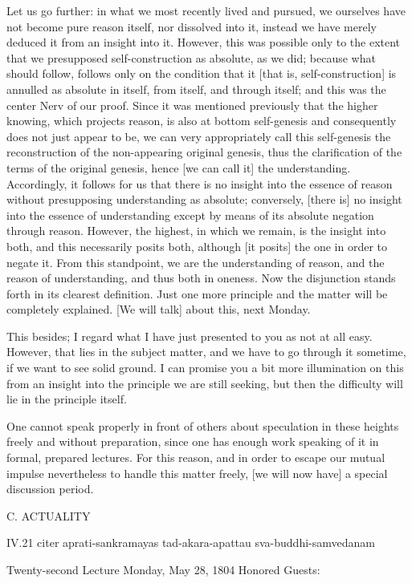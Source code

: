 Let us go further:
in what we most recently lived and pursued,
we ourselves have not become pure reason itself,
nor dissolved into it, instead we have merely
deduced it from an insight into it.
However, this was possible only to the extent
that we presupposed self-construction as absolute, as we did;
because what should follow, follows only
on the condition that it [that is, self-construction] is
annulled as absolute in itself, from itself, and through itself;
and this was the center {Nerv} of our proof.
Since it was mentioned previously that the higher knowing,
which projects reason, is also at bottom self-genesis
and consequently does not just appear to be,
we can very appropriately call this self-genesis
the reconstruction of the non-appearing original genesis,
thus the clarification of the terms of the original genesis,
hence [we can call it] the understanding.
Accordingly, it follows for us that
there is no insight into the essence of reason
without presupposing understanding as absolute;
conversely, [there is] no insight into
the essence of understanding except by
means of its absolute negation through reason.
However, the highest, in which we remain,
is the insight into both,
and this necessarily posits both,
although [it posits] the one in order to negate it.
From this standpoint, we are the understanding of reason,
and the reason of understanding, and thus both in oneness.
Now the disjunction stands forth in its clearest definition.
Just one more principle and the matter will be completely explained.
[We will talk] about this, next Monday.

This besides; I regard what I have just
presented to you as not at all easy.
However, that lies in the subject matter,
and we have to go through it sometime,
if we want to see solid ground.
I can promise you a bit more illumination on this
from an insight into the principle we are still seeking,
but then the difficulty will lie in the principle itself.

One cannot speak properly in front of others about
speculation in these heights freely and without preparation,
since one has enough work speaking of it in formal, prepared lectures.
For this reason, and in order to escape our
mutual impulse nevertheless to handle this matter freely,
[we will now have] a special discussion period.

C. ACTUALITY

IV.21
citer aprati-sankramayas tad-akara-apattau sva-buddhi-samvedanam

Twenty-second Lecture
Monday, May 28, 1804
Honored Guests:

